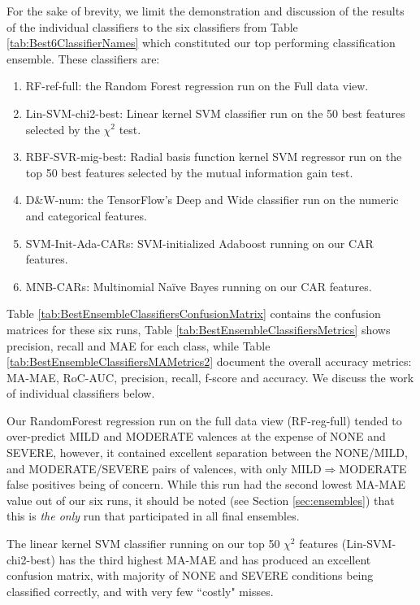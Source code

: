 For the sake of brevity, we limit the demonstration and discussion
of the results of the individual classifiers to the six
classifiers from Table \ref{tab:Best6ClassifierNames} which
constituted our top performing classification ensemble.
These classifiers are:
\begin{enumerate}
\item \textsf{RF-ref-full}: the Random Forest regression run on the \textsf{Full}
data view.
\item \textsf{Lin-SVM-chi2-best}: Linear kernel SVM classifier run
on the 50 best features selected by the  $\chi^2$ test.
\item \textsf{RBF-SVR-mig-best}: Radial basis function kernel SVM regressor run on
the top 50 best features selected by the mutual information gain test.
\item \textsf{D\&W-num}: the TensorFlow's Deep and Wide classifier run on
the numeric and categorical features.
\item \textsf{SVM-Init-Ada-CARs}: SVM-initialized Adaboost running on our CAR features.
\item \textsf{MNB-CARs}: Multinomial Na\"{i}ve Bayes running on our CAR features.

\end{enumerate}

Table \ref{tab:BestEnsembleClassifiersConfusionMatrix} contains the
confusion matrices for these six runs, Table \ref{tab:BestEnsembleClassifiersMetrics}
shows precision, recall and \textsf{MAE} for each class, while Table~ \ref{tab:BestEnsembleClassifiersMAMetrics2}
document the overall accuracy metrics: \textsf{MA-MAE}, \textsf{RoC-AUC}, precision, recall, f-score and accuracy.  We discuss the work of individual classifiers
below.

Our \textsf{RandomForest} regression run on the full data view (\textsf{RF-reg-full})
tended to over-predict \textsf{MILD} and \textsf{MODERATE} valences at the expense of
\textsf{NONE} and \textsf{SEVERE}, however, it contained excellent separation 
between the \textsf{NONE}/\textsf{MILD}, and \textsf{MODERATE}/\textsf{SEVERE} pairs
of valences, with only \textsf{MILD}$\Rightarrow$\textsf{MODERATE} false positives
being of concern.  While this run had the second lowest \textsf{MA-MAE} value out of our
six runs, it should be noted (see Section \ref{sec:ensembles}) that this is \textit{the only}
run that participated in all final ensembles. 

The linear kernel SVM classifier running on our top 50 $\chi^2$ features
(\textsf{Lin-SVM-chi2-best}) has the third highest \textsf{MA-MAE} and
has produced an excellent confusion matrix, with majority of \textsf{NONE}
and \textsf{SEVERE} conditions being classified correctly, and with very few
``costly" misses.

